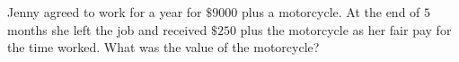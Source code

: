 Jenny agreed to work for a year for $\$9000$ plus a motorcycle. At the end of $5$ months she left the job and received $\$250$ plus the motorcycle as her fair pay for the time worked. What was the value of the motorcycle?
